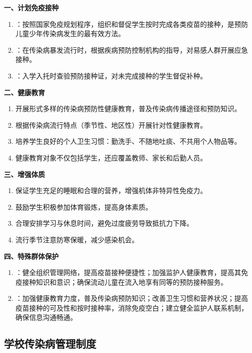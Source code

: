 \begin{keybox}
\textbf{一、计划免疫接种}
\begin{enumerate}[leftmargin=*]
    \item {}：按照国家免疫规划程序，组织和督促学生按时完成各类疫苗的接种，是预防儿童少年传染病发生的最有效方法。
    \item {}：在传染病暴发流行时，根据疾病预防控制机构的指导，对易感人群开展应急接种。
    \item {}：入学入托时查验预防接种证，对未完成接种的学生督促补种。
\end{enumerate}

\textbf{二、健康教育}
\begin{enumerate}[leftmargin=*]
    \item 开展形式多样的传染病预防性健康教育，普及传染病传播途径和预防知识。
    \item 根据传染病流行特点（季节性、地区性）开展针对性健康教育。
    \item 培养学生良好的个人卫生习惯：勤洗手、不随地吐痰、不共用个人物品等。
    \item 健康教育对象不仅包括学生，还应覆盖教师、家长和后勤人员。
\end{enumerate}

\textbf{三、增强体质}
\begin{enumerate}[leftmargin=*]
    \item 保证学生充足的睡眠和合理的营养，增强机体非特异性免疫力。
    \item 鼓励学生积极参加体育锻炼，提高身体素质。
    \item 合理安排学习与休息时间，避免过度疲劳导致抵抗力下降。
    \item 流行季节注意防寒保暖，减少感染机会。
\end{enumerate}

\textbf{四、特殊群体保护}
\begin{enumerate}[leftmargin=*]
    \item {}：健全组织管理网络，提高疫苗接种便捷性；加强监护人健康教育，提高其免疫接种知识和意识；确保流动儿童在流入地享有同等的预防接种服务。
    \item {}：加强健康教育力度，普及传染病预防知识；改善卫生习惯和营养状况；提高疫苗接种的可及性和按时接种率，消除免疫空白；建立健全监护人联系机制，确保信息沟通畅通。
\end{enumerate}
\end{keybox}

\subsection{学校传染病管理制度}

